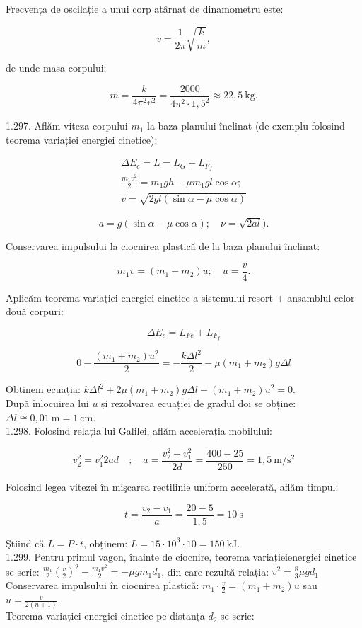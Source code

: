\documentclass[10pt]{article}
\begin{document}
Frecvența de oscilație a unui corp atârnat de dinamometru este:

$$
v=\frac{1}{2 \pi} \sqrt{\frac{k}{m}},
$$

de unde masa corpului:

$$
m=\frac{k}{4 \pi^{2} v^{2}}=\frac{2000}{4 \pi^{2} \cdot 1,5^{2}} \approx 22,5 \mathrm{~kg} .
$$

1.297. Aflăm viteza corpului $m_{1}$ la baza planului înclinat (de exemplu folosind teorema variației energiei cinetice):


\begin{gather*}
\Delta E_{c}=L=L_{G}+L_{F_{f}} \\
\frac{m_{1} v^{2}}{2}=m_{1} g h-\mu m_{1} g l \cos \alpha ; \\
v=\sqrt{2 g l(\sin \alpha-\mu \cos \alpha)} \tag{(Variantă:}
\end{gather*}


$$
a=g(\sin \alpha-\mu \cos \alpha) ; \quad \nu=\sqrt{2 a l}) .
$$

Conservarea impulsului la ciocnirea plastică de la baza planului înclinat:

$$
m_{1} v=\left(m_{1}+m_{2}\right) u ; \quad u=\frac{v}{4} .
$$

Aplicăm teorema variației energiei cinetice a sistemului resort + ansamblul celor două corpuri:

$$
\Delta E_{c}=L_{F e}+L_{F_{f}}
$$

$$
0-\frac{\left(m_{1}+m_{2}\right) u^{2}}{2}=-\frac{k \Delta l^{2}}{2}-\mu\left(m_{1}+m_{2}\right) g \Delta l
$$

Obținem ecuația: $k \Delta l^{2}+2 \mu\left(m_{1}+m_{2}\right) g \Delta l-\left(m_{1}+m_{2}\right) u^{2}=0$.\\
După înlocuirea lui $u$ și rezolvarea ecuației de gradul doi se obține: $\Delta l \cong 0,01 \mathrm{~m}=1 \mathrm{~cm}$.\\
1.298. Folosind relația lui Galilei, aflăm accelerația mobilului:

$$
v_{2}^{2}=v_{1}^{2} 2 a d \quad ; \quad a=\frac{v_{2}^{2}-v_{1}^{2}}{2 d}=\frac{400-25}{250}=1,5 \mathrm{~m} / \mathrm{s}^{2}
$$

Folosind legea vitezei în mişcarea rectilinie uniform accelerată, aflăm timpul:

$$
t=\frac{v_{2}-v_{1}}{a}=\frac{20-5}{1,5}=10 \mathrm{~s}
$$

Ştiind că $L=P \cdot t$, obținem: $L=15 \cdot 10^{3} \cdot 10=150 \mathrm{~kJ}$.\\
1.299. Pentru primul vagon, înainte de ciocnire, teorema variațieienergiei cinetice se scrie: $\frac{m_{1}}{2}\left(\frac{v}{2}\right)^{2}-\frac{m_{1} v^{2}}{2}=-\mu g m_{1} d_{1}$, din care rezultă relația: $v^{2}=\frac{8}{3} \mu g d_{1}$\\
Conservarea impulsului în ciocnirea plastică: $m_{1} \cdot \frac{v}{2}=\left(m_{1}+m_{2}\right) u$ sau $u=\frac{v}{2(n+1)}$.\\
Teorema variației energiei cinetice pe distanța $d_{2}$ se scrie:
\end{document}
